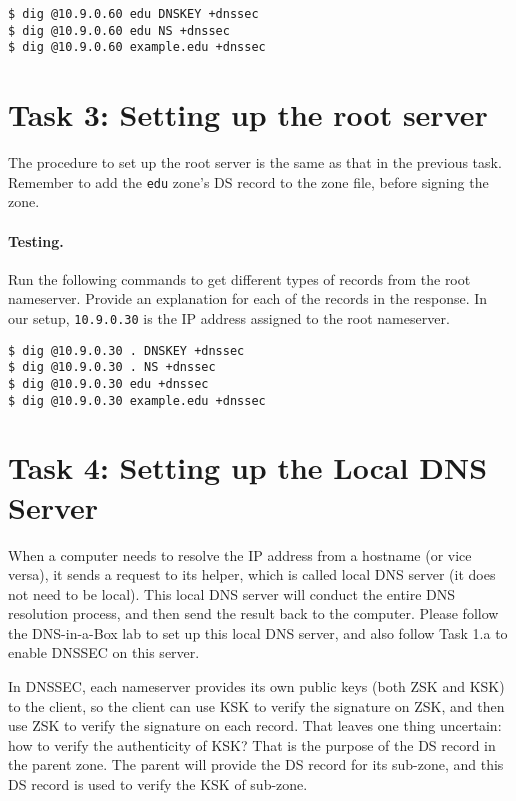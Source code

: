 \begin{lstlisting}
$ dig @10.9.0.60 edu DNSKEY +dnssec
$ dig @10.9.0.60 edu NS +dnssec
$ dig @10.9.0.60 example.edu +dnssec
\end{lstlisting}




\section{Task 3: Setting up the root server} 

The procedure to set up the root server is the same as that in the 
previous task. Remember to add the \texttt{edu} zone's DS record 
to the zone file, before signing the zone.  


\paragraph{Testing.}
Run the following commands to get different types of records
from the root nameserver. Provide an explanation
for each of the records in the response. In our setup,
\texttt{10.9.0.30} is the 
IP address assigned to the root nameserver.


\begin{lstlisting}
$ dig @10.9.0.30 . DNSKEY +dnssec
$ dig @10.9.0.30 . NS +dnssec
$ dig @10.9.0.30 edu +dnssec
$ dig @10.9.0.30 example.edu +dnssec
\end{lstlisting}




\section{Task 4: Setting up the Local DNS Server} 


When a computer needs to resolve the IP address from a hostname (or vice versa),
it sends a request to its helper, which is called local DNS server (it
does not need to be local).  This local DNS server will conduct the
entire DNS resolution process, and then send the result back to the computer.
Please follow the DNS-in-a-Box lab to set up this local DNS server, and also
follow Task 1.a to enable DNSSEC on this server. 

In DNSSEC, each nameserver provides its own public keys (both ZSK and KSK) to
the client, so the client can use KSK to verify the signature on ZSK, and then use ZSK to 
verify the signature on each record. That leaves one thing uncertain: how to verify
the authenticity of KSK? That is the purpose of the DS record in the parent zone. 
The parent will provide the DS record for its sub-zone, and this DS record is used 
to verify the KSK of sub-zone. 

